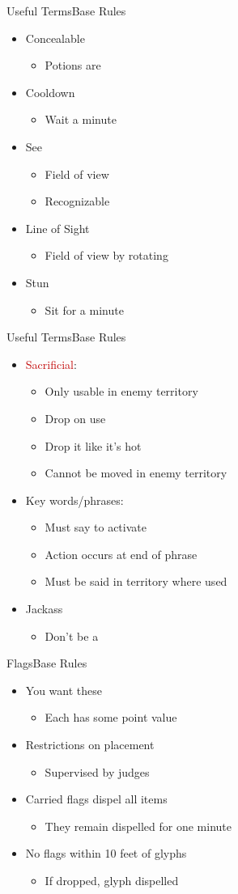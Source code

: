 \documentclass[17pt]{beamer}
\newcommand{\R}{\textcolor[HTML]{C00000}}
\newcommand{\subitem}[1]{\begin{itemize} \item #1 \end{itemize}}
\begin{document}
\begin{frame}{Useful Terms}{Base Rules}
  \begin{itemize}
  \item Concealable
    \subitem{Potions are}
  \item Cooldown
    \subitem{Wait a minute}
  \item See
    \begin{itemize}
    \item Field of view
    \item Recognizable
    \end{itemize}
  \item Line of Sight
    \subitem{Field of view by rotating}
  \item Stun
    \subitem{Sit for a minute}
  \end{itemize}
\end{frame}

\begin{frame}{Useful Terms}{Base Rules}
  \begin{itemize}
  \item \R{Sacrificial}:
    \begin{itemize}
    \item Only usable in enemy territory
    \item Drop on use
    \item<2> Drop it like it's hot
    \item Cannot be moved in enemy territory
    \end{itemize}
  \item Key words/phrases:
    \begin{itemize}
    \item Must say to activate
    \item Action occurs at end of phrase
    \item Must be said in territory where used
    \end{itemize}
  \item Jackass
    \subitem{Don't be a}
  \end{itemize}
\end{frame}


\begin{frame}{Flags}{Base Rules}
  \begin{itemize}
  \item You want these
    \subitem{Each has some point value}
  \item Restrictions on placement
    \subitem{Supervised by judges}
  \item Carried flags dispel all items
    \subitem{They remain dispelled for one minute}
  \item No flags within 10 feet of glyphs
    \subitem{If dropped, glyph dispelled}
  \end{itemize}
\end{frame}
\end{document}
